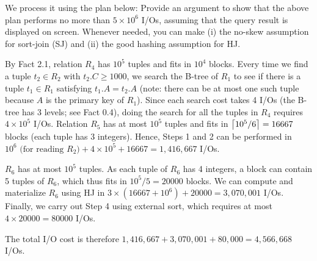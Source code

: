 We process it using the plan below:
\noindent Provide an argument to show that the above plan performs no more than $5 \times 10^6$ I/Os, assuming that the query result is displayed on screen. Whenever needed, you can make (i) the no-skew assumption for sort-join (SJ) and (ii) the good hashing assumption for HJ.

\begin{sol}
     By Fact 2.1, relation $R_4$ has $10^5$ tuples and fits in $10^4$ blocks. Every time we find a tuple $t_2 \in R_2$ with $t_2.C \ge 1000$, we search the B-tree of $R_1$ to see if there is a tuple $t_1 \in R_1$ satisfying $t_1.A = t_2.A$ (note: there can be at most one such tuple because $A$ is the primary key of $R_1$). Since each search cost takes 4 I/Os (the B-tree has 3 levels; see Fact 0.4), doing the search for all the tuples in $R_4$ requires $4 \times 10^5$ I/Os. Relation $R_5$ has at most $10^5$ tuples and fits in $\left \lceil 10^5 / 6 \right \rceil = 16667$ blocks (each tuple has 3 integers). Hence, Steps 1 and 2 can be performed in $
        10^6 \text{ (for reading $R_2$)} + 4 \times 10^5 + 16667 = 1,416,667
    $ I/Os.

    \vgap

    $R_6$ has at most $10^5$ tuples. As each tuple of $R_6$ has 4 integers, a block can contain 5 tuples of $R_6$, which thus fits in $10^5 / 5 = 20000$ blocks. We can compute  and materialize $R_6$ using HJ in $3 \times (16667 + 10^6) + 20000 = 3,070,001$ I/Os.
    Finally, we carry out Step 4 using external sort, which requires at most $4 \times 20000 = 80000$ I/Os.

    \vgap

    The total I/O cost is therefore $1,416,667 + 3,070,001 + 80,000 =4,566,668$ I/Os.
\end{sol}



